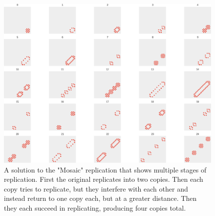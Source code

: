 \begin{figure}[h]
\centering
\includegraphics[height=0.4\textheight, width=\textwidth, keepaspectratio]{fig/result_figs/replicate_mosaic/7}
\caption[A solution to the "Mosaic" replication]{A solution to the "Mosaic" replication that shows multiple stages of replication.
First the original replicates into two copies. Then each copy tries to replicate, but they interfere with each other and instead return to one copy each, but at a greater distance.
Then they each succeed in replicating, producing four copies total.}
\label{fig:mosaic7}
\end{figure}


